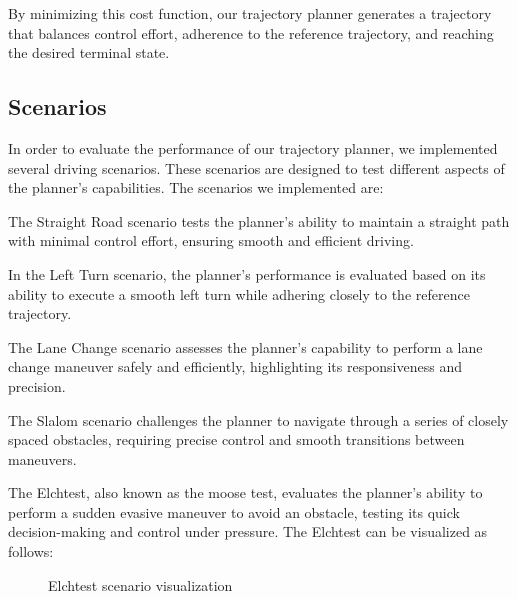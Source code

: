 By minimizing this cost function, our trajectory planner generates a trajectory that balances control effort, adherence to the reference trajectory,
and reaching the desired terminal state.

\subsection{Scenarios} \label{subsec:scenarios}

In order to evaluate the performance of our trajectory planner, we implemented several driving scenarios.
These scenarios are designed to test different aspects of the planner's capabilities.
The scenarios we implemented are:

The Straight Road scenario tests the planner's ability to maintain a straight path with minimal
control effort, ensuring smooth and efficient driving.

In the Left Turn scenario, the planner's performance is evaluated based on its ability to execute a smooth left turn while adhering closely to the
reference trajectory.

The Lane Change scenario assesses the planner's capability to perform a lane change maneuver safely and efficiently, highlighting its responsiveness
and precision.

The Slalom scenario challenges the planner to navigate through a series of closely spaced obstacles, requiring precise control and smooth transitions
between maneuvers.

The Elchtest, also known as the moose test, evaluates the planner's ability to perform a sudden evasive maneuver to avoid an obstacle, testing its
quick decision-making and control under pressure.
The Elchtest can be visualized as follows:
\begin{figure}[H]
	\centering
	\caption{Elchtest scenario visualization}
	\label{fig:elchtest}
\end{figure}

